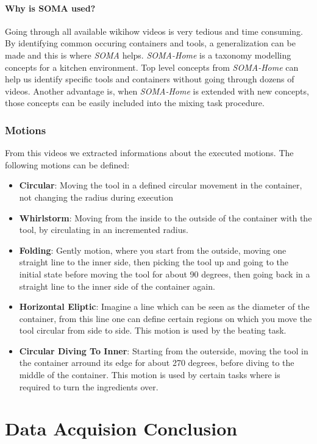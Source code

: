 \paragraph{Why is SOMA used?}

Going through all available wikihow videos is very tedious and time consuming. By identifying common occuring containers and tools, 
a generalization can be made and this is where \textit{SOMA} helps. \textit{SOMA-Home} is a taxonomy modelling concepts for a kitchen environment.
Top level concepts from \textit{SOMA-Home} can help us identify specific tools and containers without going through dozens of videos. 
Another advantage is, when \textit{SOMA-Home} is extended with new concepts, those concepts can be easily included into the mixing task procedure.   


\subsubsection{Motions}
	From this videos we extracted informations about the executed motions. The following motions can be defined:
	\begin{itemize}
		\item \textbf{Circular}: Moving the tool in a defined circular movement in the container, not changing the radius during execution
		\item \textbf{Whirlstorm}: Moving from the inside to the outside of the container with the tool, by circulating in an incremented radius.
		\item \textbf{Folding}: Gently motion, where you start from the outside, moving one straight line to the inner side, then picking the tool up and going to the initial state before moving the tool for about 90 degrees, then going back in a straight line to the inner side of the container again.
		\item \textbf{Horizontal Eliptic}: Imagine a line which can be seen as the diameter of the container, from this line one can define certain regions on which you move the tool circular from side to side. This motion is used by the beating task.
		\item \textbf{Circular Diving To Inner}: Starting from the outerside, moving the tool in the container arround its edge for about 270 degrees, before diving to the middle of the container. This motion is used by certain tasks where is required to turn the ingredients over.
	\end{itemize}

\section{Data Acquision Conclusion}

